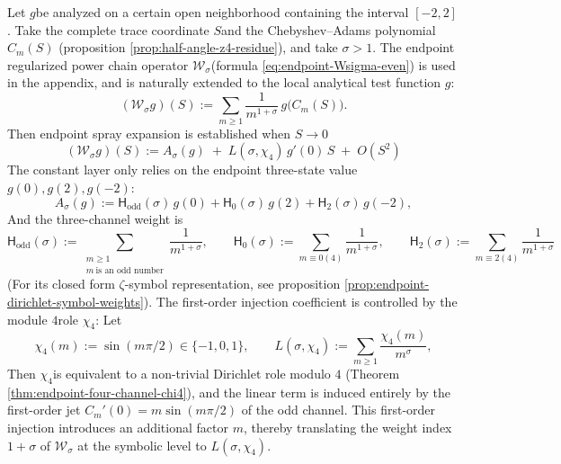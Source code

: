 \begin{theorem}\label{thm:xi-endpoint-two-symbol-jet}
Let \(g\) ​​be analyzed on a certain open neighborhood containing the interval \([-2,2]\).
Take the complete trace coordinate \(S\) ​​and the Chebyshev--Adams polynomial \(C_m(S)\) (proposition \ref{prop:half-angle-z4-residue}), and take \(\sigma>1\).
The endpoint regularized power chain operator \(\mathcal W_\sigma\) ​​(formula \eqref{eq:endpoint-Wsigma-even}) is used in the appendix, and is naturally extended to the local analytical test function \(g\):
\[
(\mathcal W_\sigma g)(S):=\sum_{m\ge 1}\frac{1}{m^{1+\sigma}}\,g\!\bigl(C_m(S)\bigr).
\]
Then endpoint spray expansion is established when \(S\to 0\)
\begin{equation}\label{eq:xi-endpoint-two-symbol-jet}
\boxed{\;
(\mathcal W_\sigma g)(S)
:=A_\sigma(g)\;+\;L(\sigma,\chi_4)\,g'(0)\,S\;+\;O(S^2)\;}
\end{equation}
The constant layer only relies on the endpoint three-state value \(g(0),g(2),g(-2)\):
\[
A_\sigma(g):=\mathsf H_{\mathrm{odd}}(\sigma)\,g(0)+\mathsf H_{0}(\sigma)\,g(2)+\mathsf H_{2}(\sigma)\,g(-2),
\]
And the three-channel weight is
\[
\mathsf H_{\mathrm{odd}}(\sigma):=\sum_{\substack{m\ge 1\\ m\ \text{is an odd number}}}\frac{1}{m^{1+\sigma}},\qquad
\mathsf H_{0}(\sigma):=\sum_{m\equiv 0(4)}\frac{1}{m^{1+\sigma}},\qquad
\mathsf H_{2}(\sigma):=\sum_{m\equiv 2(4)}\frac{1}{m^{1+\sigma}}
\]
(For its closed form \(\zeta\)-symbol representation, see proposition \ref{prop:endpoint-dirichlet-symbol-weights}).
The first-order injection coefficient is controlled by the module \(4\) ​​role \(\chi_4\): Let
\[
\chi_4(m):=\sin(m\pi/2)\in\{-1,0,1\},
\qquad
L(\sigma,\chi_4):=\sum_{m\ge 1}\frac{\chi_4(m)}{m^\sigma},
\]
Then \(\chi_4\) ​​is equivalent to a non-trivial Dirichlet role modulo \(4\) (Theorem \ref{thm:endpoint-four-channel-chi4}), and the linear term is induced entirely by the first-order jet \(C_m'(0)=m\sin(m\pi/2)\) of the odd channel.
This first-order injection introduces an additional factor \(m\), thereby translating the weight index \(1+\sigma\) of \(\mathcal W_\sigma\) at the symbolic level to \(L(\sigma,\chi_4)\).
\end{theorem}

